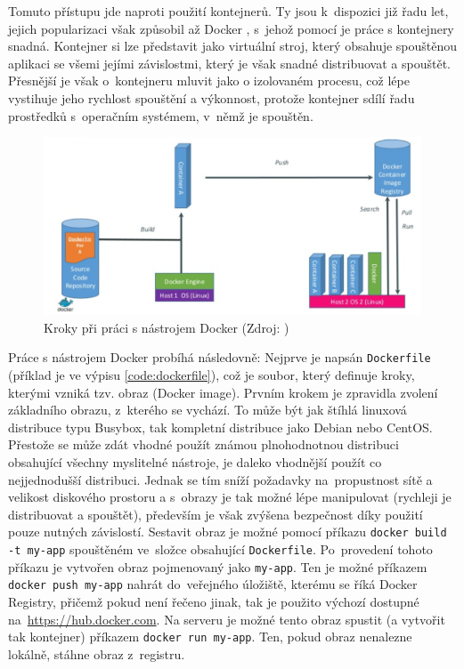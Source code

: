 \documentclass[FM,DP]{tulthesis}
\begin{document}
Tomuto přístupu jde naproti použití kontejnerů. Ty jsou k~dispozici již řadu let, jejich popularizaci však
způsobil až Docker \cite{docker}, s~jehož pomocí je práce s kontejnery snadná. Kontejner si lze představit jako 
virtuální stroj, který obsahuje spouštěnou aplikaci se všemi jejími závislostmi, který je však snadné distribuovat 
a spouštět. Přesnější je však o~kontejneru mluvit jako o izolovaném procesu, což lépe vystihuje jeho rychlost
spouštění a výkonnost, protože kontejner sdílí řadu prostředků s~operačním systémem, v~němž je spouštěn.

\begin{figure}[h]
\center
\includegraphics[width=\textwidth]{docker-flow.png}
\caption{Kroky při práci s nástrojem Docker (Zdroj: \cite{docker-flow})}
\label{docker-flow}
\end{figure}

Práce s nástrojem Docker probíhá následovně: Nejprve je napsán \verb|Dockerfile| (příklad je ve výpisu
\ref{code:dockerfile}), což je soubor, který definuje kroky, kterými vzniká tzv. obraz (Docker image). Prvním 
krokem je zpravidla zvolení základního obrazu, z~kterého se vychází. To může být jak štíhlá linuxová distribuce typu 
Busybox, tak kompletní distribuce jako Debian nebo CentOS. Přestože se může zdát vhodné použít známou plnohodnotnou
distribuci obsahující všechny myslitelné nástroje, je daleko vhodnější použít co nejjednodušší distribuci. Jednak se 
tím sníží požadavky na~propustnost sítě a velikost diskového prostoru a s~obrazy je tak možné lépe manipulovat (rychleji 
je distribuovat a spouštět), především je však zvýšena bezpečnost díky použití pouze nutných závislostí. Sestavit obraz 
je možné pomocí příkazu \verb|docker build -t my-app| spouštěném ve~složce obsahující \verb|Dockerfile|. Po~provedení 
tohoto příkazu je vytvořen obraz pojmenovaný jako \verb|my-app|. Ten je možné příkazem \verb|docker push my-app| 
nahrát do~veřejného úložiště, kterému se říká Docker Registry, přičemž pokud není řečeno jinak, tak je použito 
výchozí dostupné na~\url{https://hub.docker.com}. Na serveru je možné tento obraz spustit (a vytvořit tak kontejner)
příkazem \verb|docker run my-app|. Ten, pokud obraz nenalezne lokálně, stáhne obraz z~registru.
\end{document}
